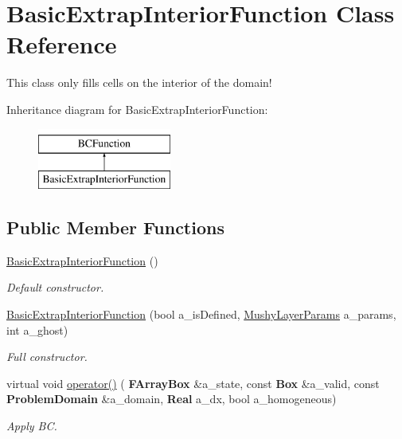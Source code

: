 \hypertarget{class_basic_extrap_interior_function}{}\section{Basic\+Extrap\+Interior\+Function Class Reference}
\label{class_basic_extrap_interior_function}


This class only fills cells on the interior of the domain!  


Inheritance diagram for Basic\+Extrap\+Interior\+Function\+:\begin{figure}[H]
\begin{center}
\leavevmode
\includegraphics[height=2.000000cm]{class_basic_extrap_interior_function}
\end{center}
\end{figure}
\subsection*{Public Member Functions}
\begin{DoxyCompactItemize}
\item 
\mbox{\label{class_basic_extrap_interior_function_a27c9cd01ac58476e1501d762d29a0b22}} 
\hyperlink{class_basic_extrap_interior_function_a27c9cd01ac58476e1501d762d29a0b22}{Basic\+Extrap\+Interior\+Function} ()
\begin{DoxyCompactList}\small\item\em Default constructor. \end{DoxyCompactList}\item 
\mbox{\label{class_basic_extrap_interior_function_a2b065fb8eac306deec75ae29512ea8fd}} 
\hyperlink{class_basic_extrap_interior_function_a2b065fb8eac306deec75ae29512ea8fd}{Basic\+Extrap\+Interior\+Function} (bool a\+\_\+is\+Defined, \hyperlink{class_mushy_layer_params}{Mushy\+Layer\+Params} a\+\_\+params, int a\+\_\+ghost)
\begin{DoxyCompactList}\small\item\em Full constructor. \end{DoxyCompactList}\item 
\mbox{\label{class_basic_extrap_interior_function_a67862d99ecbc2102bac335e28d7f39d4}} 
virtual void \hyperlink{class_basic_extrap_interior_function_a67862d99ecbc2102bac335e28d7f39d4}{operator()} (\textbf{ F\+Array\+Box} \&a\+\_\+state, const \textbf{ Box} \&a\+\_\+valid, const \textbf{ Problem\+Domain} \&a\+\_\+domain, \textbf{ Real} a\+\_\+dx, bool a\+\_\+homogeneous)
\begin{DoxyCompactList}\small\item\em Apply BC. \end{DoxyCompactList}\end{DoxyCompactItemize}
